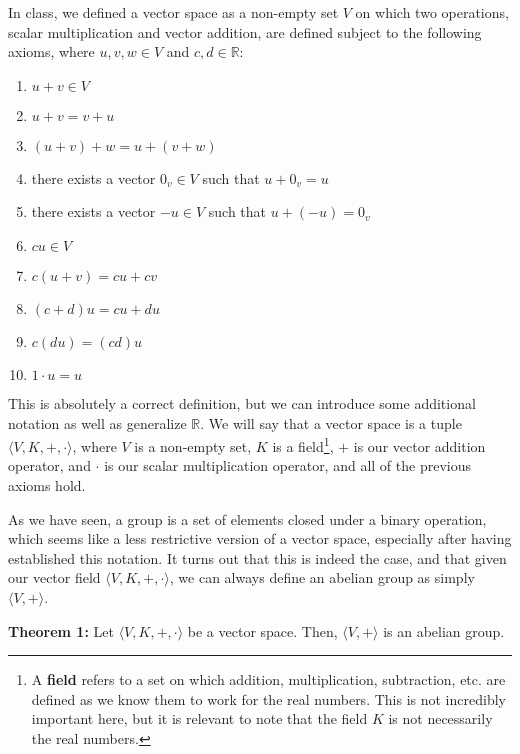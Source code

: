 \documentclass{article}
\newcommand{\R}{\mathbb{R}}
\begin{document}
In class, we defined a vector space as a non-empty set $V$ on which two operations,
scalar multiplication and vector addition, are defined subject to the following axioms,
where $u,v,w \in V$ and $c,d \in \R$:
\begin{enumerate}
    \item $u+v \in V$
    \item $u+v = v+u$
    \item $(u+v)+w = u+(v+w)$
    \item there exists a vector $0_v \in V$ such that $u+0_v = u$
    \item there exists a vector $-u \in V$ such that $u+(-u) = 0_v$
    \item $cu\in V$
    \item $c(u+v) = cu+cv$
    \item $(c+d)u = cu+du$
    \item $c(du) = (cd)u$
    \item $1 \cdot u = u$
\end{enumerate}
This is absolutely a correct definition, but we can introduce some additional 
notation as well as generalize $\R$. We will say that a vector space is a tuple 
$\langle V, K, +, \cdot \rangle$, where $V$ is a non-empty set, $K$ is a field\footnote[2]{A \textbf{field} refers to a set on which addition, multiplication, subtraction, etc. are defined as we know them to work for the real numbers. This is not incredibly important here, but it is relevant to note that the field $K$ is not necessarily the real numbers.},
$+$ is our vector addition operator, and $\cdot$ is our scalar multiplication operator,
and all of the previous axioms hold.

As we have seen, a group is a set of elements closed under a binary operation, which 
seems like a less restrictive version of a vector space, especially after having 
established this notation. It turns out that this is indeed the case, and that 
given our vector field $\langle V, K, +, \cdot \rangle$, we can always define 
an abelian group as simply $\langle V, + \rangle$.

\begin{mdframed}[roundcorner=10pt, backgroundcolor=gray!10]
  \textbf{Theorem 1:} Let $\langle V, K, +, \cdot \rangle$ be a vector space. Then,
  $\langle V, + \rangle$ is an abelian group.
\end{mdframed}
\end{document}
